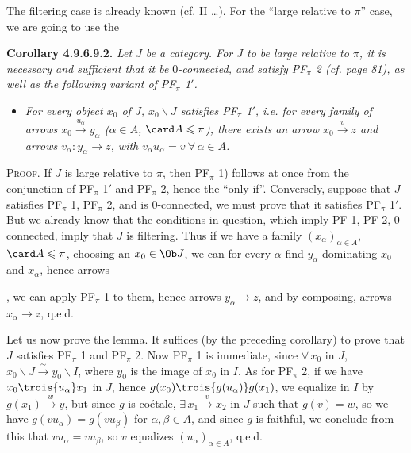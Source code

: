 
The filtering case is already known (cf. II \dots). For the ``large relative to $\pi$'' case, we are going to use the

\textbf{Corollary 4.9.6.9.2.} \textit{Let $J$ be a category. For $J$ to be large relative to $\pi$, it}
\textit{is necessary and sufficient that it be $0$-connected, and satisfy PF$_\pi$ 2 (cf. page 81), as well as the following variant of PF$_\pi$ 1$'$.}
\begin{itemize}[leftmargin=4em]
\item[\textit{PF$_\pi$ 1)}] \textit{For every object $x_0$ of $J$, $x_0\backslash J$ satisfies PF$_\pi$ 1$'$, i.e. for every family of arrows $x_0 \xrightarrow{u_\alpha} y_\alpha$ ($\alpha \in A$, $\card A \leqslant \pi$), there exists an arrow $x_0 \xrightarrow{v} z$ and arrows $v_\alpha : y_\alpha \longrightarrow z$, with $v_\alpha u_\alpha = v \ \forall\, \alpha \in A$.}
\end{itemize}

\textsc{Proof}. If $J$ is large relative to $\pi$, then PF$_\pi$ 1) follows at once from the conjunction of PF$_\pi$ 1$'$ and PF$_\pi$ 2, hence the ``only if''. Conversely, suppose that $J$ satisfies PF$_\pi$ 1, PF$_\pi$ 2, and is 0-connected, we must prove that it satisfies PF$_\pi$ 1$'$. But we already know that the conditions in question, which imply PF 1, PF 2, 0-connected, imply that $J$ is filtering. Thus if we have a family $(x_\alpha)_{\alpha\in A}$, $\card A \leqslant \pi$, choosing an $x_0 \in \Ob J$, we can for every $\alpha$ find $y_\alpha$ dominating $x_0$ and $x_\alpha$, hence arrows
, we can apply PF$_\pi$ 1 to them, hence arrows $y_\alpha \longrightarrow z$, and by composing, arrows $x_\alpha \longrightarrow z$, q.e.d. %

Let us now prove the lemma. It suffices (by the preceding corollary) to prove that $J$ satisfies PF$_\pi$ 1 and PF$_\pi$ 2. Now PF$_\pi$ 1 is immediate, since $\forall\, x_0$ in $J$, $x_0\backslash J \xrightarrow{\ \sim\ } y_0\backslash I$, where $y_0$ is
the image of $x_0$ in $I$. As for PF$_\pi$ 2, if we have $x_0 \trois{u_\alpha} x_1$ in $J$, hence $g(x_0) \trois{g(u_\alpha)} g(x_1)$, we equalize in $I$ by $g(x_1) \xrightarrow{w} y$, but since $g$ is coétale, $\exists\, x_1 \xrightarrow{v} x_2$ in $J$ such that $g(v) = w$, so we have $g(vu_\alpha) = g(vu_\beta)$ for $\alpha, \beta \in A$, and since $g$ is faithful, we conclude from this that $vu_\alpha = vu_\beta$, so $v$ equalizes $(u_\alpha)_{\alpha\in A}$, q.e.d.

